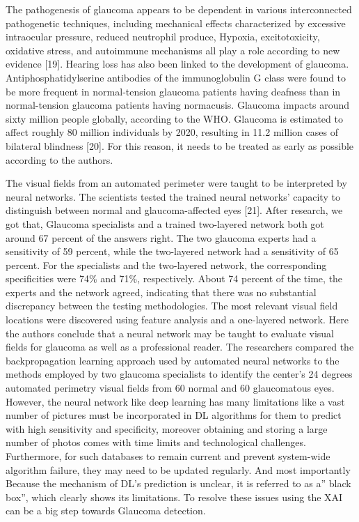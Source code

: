 \vspace{5mm}
\noindent The pathogenesis of glaucoma appears to be dependent in various interconnected pathogenetic techniques, including mechanical effects characterized by excessive intraocular pressure, reduced neutrophil produce, Hypoxia, excitotoxicity, oxidative stress, and autoimmune mechanisms all play a role according to new evidence [19]. Hearing loss has also been linked to the development of glaucoma. Antiphosphatidylserine antibodies of the immunoglobulin G class were found to be more frequent in normal-tension glaucoma patients having deafness than in normal-tension glaucoma patients having normacusis. Glaucoma impacts around sixty million people globally, according to the WHO. Glaucoma is estimated to affect roughly 80 million individuals by 2020, resulting in 11.2 million cases of bilateral blindness [20]. For this reason, it needs to be treated as early as possible according to the authors.

\vspace{5mm}
\noindent The visual fields from an automated perimeter were taught to be interpreted by neural networks. The scientists tested the trained neural networks’ capacity to distinguish between normal and glaucoma-affected eyes [21]. After research, we got that, Glaucoma specialists and a trained two-layered network both got around 67 percent of the answers right. The two glaucoma experts had a sensitivity of 59 percent, while the two-layered network had a sensitivity of 65 percent. For the specialists and the two-layered network, the corresponding specificities were 74\% and 71\%, respectively. About 74 percent of the time, the experts and the network agreed, indicating that there was no substantial discrepancy between the testing methodologies. The most relevant visual field locations were discovered using feature analysis and a one-layered network. Here the authors conclude that a neural network may be taught to evaluate visual fields for glaucoma as well as a professional reader. The researchers compared the backpropagation learning approach used by automated neural networks to the methods employed by two glaucoma specialists to identify the center’s 24 degrees automated perimetry visual fields from 60 normal and 60 glaucomatous eyes. However, the neural network like deep learning has many limitations like a vast number of pictures must be incorporated in DL algorithms for them to predict with high sensitivity and specificity, moreover obtaining and storing a large number of photos comes with time limits and technological challenges. Furthermore, for such databases to remain current and prevent system-wide algorithm failure, they may need to be updated regularly. And most importantly Because the mechanism of DL’s prediction is unclear, it is referred to as a” black box”, which clearly shows its limitations. To resolve these issues using the XAI can be a big step towards Glaucoma detection.

